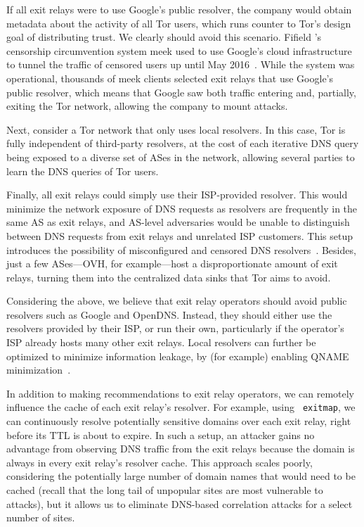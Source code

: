If all exit relays were to use Google's public resolver, the company would
obtain metadata about the activity of all Tor users, which runs counter to Tor's
design goal of distributing trust.  We clearly should avoid this scenario.
Fifield \ea's~\cite{Fifield2015a} censorship circumvention system meek used to
use Google's cloud infrastructure to tunnel the traffic of censored users up
until May 2016~\cite{meek-shutdown}.  While the system was operational,
thousands of meek clients selected exit relays that use Google's public
resolver, which means that Google saw both traffic entering and, partially,
exiting the Tor network, allowing the company to mount \name attacks.

Next, consider a Tor network that only uses local resolvers.  In this case, Tor
is fully independent of third-party resolvers, at the cost of each iterative DNS
query being exposed to a diverse set of ASes in the network, allowing several
parties to learn the DNS queries of Tor users.

Finally, all exit relays could simply use their ISP-provided resolver.  This
would minimize the network exposure of DNS requests as resolvers are frequently
in the same AS as exit relays, and AS-level adversaries would be unable to
distinguish between DNS requests from exit relays and unrelated ISP customers.
This setup introduces the possibility of misconfigured and censored DNS
resolvers~\cite[\S~4.1]{Winter2014b}.  Besides, just a few ASes---OVH, for
example---host a disproportionate amount of exit relays, turning them into the
centralized data sinks that Tor aims to avoid.

Considering the above, we believe that exit relay operators should avoid public
resolvers such as Google and OpenDNS.  Instead, they should either use the
resolvers provided by their ISP, or run their own, particularly if the
operator's ISP already hosts many other exit relays.  Local resolvers can
further be optimized to minimize information leakage, by (for example) enabling
QNAME minimization~\cite{Bortzmeyer2016a}.

In addition to making recommendations to exit relay operators, we can remotely
influence the cache of each exit relay's resolver.  For example, using {\tt
exitmap}, we can continuously resolve potentially sensitive domains over each
exit relay, right before its TTL is about to expire.  In such a setup, an
attacker gains no advantage from observing DNS traffic from the exit relays
because the domain is always in every exit relay's resolver cache.  This
approach scales poorly, considering the potentially large number of domain names
that would need to be cached (recall that the long tail of unpopular sites are
most vulnerable to \name attacks), but it allows us to eliminate DNS-based
correlation attacks for a select number of sites.

